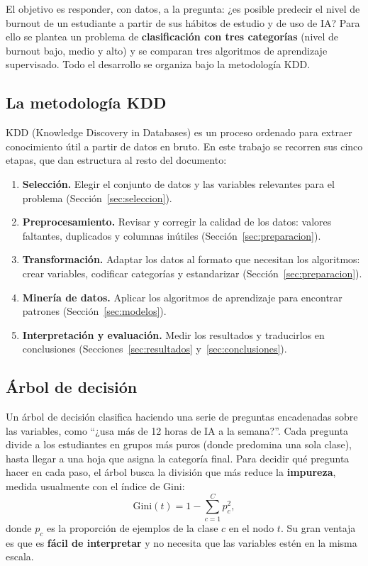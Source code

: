 \documentclass[11pt,letterpaper,twoside]{article}
\begin{document}
El objetivo es responder, con datos, a la pregunta: ¿es posible predecir el nivel de burnout de un estudiante a partir de sus hábitos de estudio y de uso de IA? Para ello se plantea un problema de \textbf{clasificación con tres categorías} (nivel de burnout bajo, medio y alto) y se comparan tres algoritmos de aprendizaje supervisado. Todo el desarrollo se organiza bajo la metodología KDD.

\subsection{La metodología KDD}
KDD (Knowledge Discovery in Databases) es un proceso ordenado para extraer conocimiento útil a partir de datos en bruto. En este trabajo se recorren sus cinco etapas, que dan estructura al resto del documento:

\begin{enumerate}[leftmargin=*]
  \item \textbf{Selección.} Elegir el conjunto de datos y las variables relevantes para el problema (Sección~\ref{sec:seleccion}).
  \item \textbf{Preprocesamiento.} Revisar y corregir la calidad de los datos: valores faltantes, duplicados y columnas inútiles (Sección~\ref{sec:preparacion}).
  \item \textbf{Transformación.} Adaptar los datos al formato que necesitan los algoritmos: crear variables, codificar categorías y estandarizar (Sección~\ref{sec:preparacion}).
  \item \textbf{Minería de datos.} Aplicar los algoritmos de aprendizaje para encontrar patrones (Sección~\ref{sec:modelos}).
  \item \textbf{Interpretación y evaluación.} Medir los resultados y traducirlos en conclusiones (Secciones~\ref{sec:resultados} y~\ref{sec:conclusiones}).
\end{enumerate}

\subsection{Árbol de decisión}
Un árbol de decisión clasifica haciendo una serie de preguntas encadenadas sobre las variables, como ``¿usa más de 12 horas de IA a la semana?''. Cada pregunta divide a los estudiantes en grupos más puros (donde predomina una sola clase), hasta llegar a una hoja que asigna la categoría final. Para decidir qué pregunta hacer en cada paso, el árbol busca la división que más reduce la \textbf{impureza}, medida usualmente con el índice de Gini:
\begin{equation}
\text{Gini}(t) = 1 - \sum_{c=1}^{C} p_c^2,
\label{eq:gini}
\end{equation}
donde $p_c$ es la proporción de ejemplos de la clase $c$ en el nodo $t$. Su gran ventaja es que es \textbf{fácil de interpretar} y no necesita que las variables estén en la misma escala.
\end{document}
